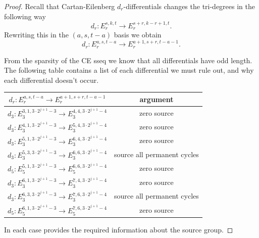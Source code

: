 \begin{proof}
  Recall that Cartan-Eilenberg $d_r$-differentials changes the tri-degrees in the following way
  $$d_r: E_r^{s,k,t} \to E_r^{s+r, k-r+1, t}.$$
  Rewriting this in the $(a,s,t-a)$ basis we obtain
  $$d_r: E_r^{a,s,t-a} \to E_r^{a+1, s+r, t-a-1}.$$
  
  From the sparsity of the CE sseq we know that all differentials have odd length.
  The following table contains a list of each differential we must rule out, and why each differential doesn't occur. 
  \begin{center}{\renewcommand{\arraystretch}{1.2}
      \begin{tabular}{|c|c|}\hline
        $d_r : E_r^{a,s,t-a} \to E_r^{a+1,s+r,t-a-1}$ & argument \\\hline\hline
        $d_3 : E_3^{3,1, 3 \cdot 2^{j+1} -3} \to E_3^{4,4, 3 \cdot 2^{j+1} -4}$ & zero source \\\hline
        $d_3 : E_3^{4,1, 3 \cdot 2^{j+1} -3} \to E_3^{5,4, 3 \cdot 2^{j+1} -4}$ & zero source \\\hline
        $d_3 : E_3^{5,1, 3 \cdot 2^{j+1} -3} \to E_3^{6,4, 3 \cdot 2^{j+1} -4}$ & zero source \\\hline
        $d_3 : E_3^{5,3, 3 \cdot 2^{j+1} -3} \to E_3^{6,6, 3 \cdot 2^{j+1} -4}$ & source all permanent cycles \\\hline
        $d_5 : E_5^{5,1, 3 \cdot 2^{j+1} -3} \to E_5^{6,6, 3 \cdot 2^{j+1} -4}$ & zero source \\\hline
        $d_3 : E_3^{6,1, 3 \cdot 2^{j+1} -3} \to E_3^{7,4, 3 \cdot 2^{j+1} -4}$ & zero source \\\hline
        $d_3 : E_3^{6,3, 3 \cdot 2^{j+1} -3} \to E_3^{7,6, 3 \cdot 2^{j+1} -4}$ & source all permanent cycles \\\hline
        $d_5 : E_5^{6,1, 3 \cdot 2^{j+1} -3} \to E_5^{7,6, 3 \cdot 2^{j+1} -4}$ & zero source \\\hline
      \end{tabular}}
  \end{center}
  In each case  provides the required information about the source group.
\end{proof}

